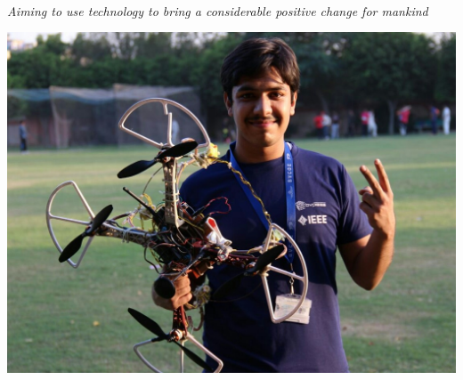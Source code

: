 \documentclass[11pt]{article}
\begin{document}
\begin{mdframed}[backgroundcolor=orange]
~
\begin{center}
\begin{Huge}
\end{Huge}
\end{center}
\begin{center}
\begin{large}
\color{white}\emph{Aiming to use technology to bring a considerable positive change for mankind}
\end{large}
\end{center}
\end{mdframed}
\begin{minipage}{0.25\linewidth}
\begin{center}
\includegraphics[scale=0.185]{siddhant_image}
\end{center}
\end{minipage}
\end{document}
